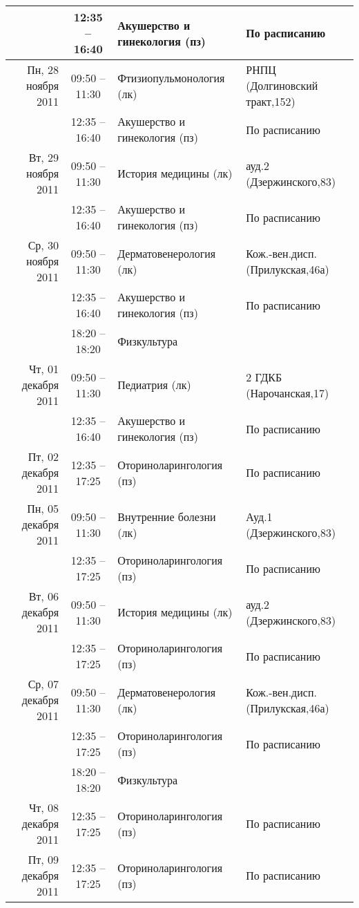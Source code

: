 \documentclass[a4paper,10pt,notitlepage]{report}
\begin{document}
\begin{center}
{\begin{longtable}{r|c|l|l|}
  & 12:35 -- 16:40 & Акушерство и гинекология (пз) & По расписанию \\ \cline{2-4}
\hline Пн, 28 ноября 2011
  & 09:50 -- 11:30 & Фтизиопульмонология (лк) & РНПЦ (Долгиновский тракт,152) \\ \cline{2-4}
  & 12:35 -- 16:40 & Акушерство и гинекология (пз) & По расписанию \\ \cline{2-4}
\hline Вт, 29 ноября 2011
  & 09:50 -- 11:30 & История медицины (лк) & ауд.2 (Дзержинского,83) \\ \cline{2-4}
  & 12:35 -- 16:40 & Акушерство и гинекология (пз) & По расписанию \\ \cline{2-4}
\hline Ср, 30 ноября 2011
  & 09:50 -- 11:30 & Дерматовенерология (лк) & Кож.-вен.дисп.(Прилукская,46а) \\ \cline{2-4}
  & 12:35 -- 16:40 & Акушерство и гинекология (пз) & По расписанию \\ \cline{2-4}
  & 18:20 -- 18:20 & Физкультура  &  \\ \cline{2-4}
\hline Чт, 01 декабря 2011
  & 09:50 -- 11:30 & Педиатрия (лк) & 2 ГДКБ (Нарочанская,17) \\ \cline{2-4}
  & 12:35 -- 16:40 & Акушерство и гинекология (пз) & По расписанию \\ \cline{2-4}
\hline Пт, 02 декабря 2011
  & 12:35 -- 17:25 & Оториноларингология (пз) & По расписанию \\ \cline{2-4}
\hline Пн, 05 декабря 2011
  & 09:50 -- 11:30 & Внутренние болезни (лк) & Ауд.1 (Дзержинского,83) \\ \cline{2-4}
  & 12:35 -- 17:25 & Оториноларингология (пз) & По расписанию \\ \cline{2-4}
\hline Вт, 06 декабря 2011
  & 09:50 -- 11:30 & История медицины (лк) & ауд.2 (Дзержинского,83) \\ \cline{2-4}
  & 12:35 -- 17:25 & Оториноларингология (пз) & По расписанию \\ \cline{2-4}
\hline Ср, 07 декабря 2011
  & 09:50 -- 11:30 & Дерматовенерология (лк) & Кож.-вен.дисп.(Прилукская,46а) \\ \cline{2-4}
  & 12:35 -- 17:25 & Оториноларингология (пз) & По расписанию \\ \cline{2-4}
  & 18:20 -- 18:20 & Физкультура  &  \\ \cline{2-4}
\hline Чт, 08 декабря 2011
  & 12:35 -- 17:25 & Оториноларингология (пз) & По расписанию \\ \cline{2-4}
\hline Пт, 09 декабря 2011
  & 12:35 -- 17:25 & Оториноларингология (пз) & По расписанию \\ \cline{2-4}

\end{longtable}}
\end{center}
\end{document}
